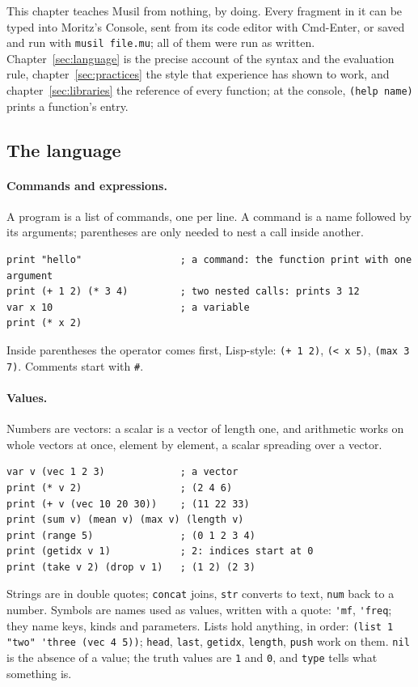 \documentclass[11pt,a4paper]{article}
\newcommand{\musil}[1]{\lstinline[style=musilinline]{#1}}
\begin{document}
This chapter teaches Musil from nothing, by doing. Every fragment in it can be typed into
Moritz's Console, sent from its code editor with Cmd-Enter, or saved and run with
\texttt{musil file.mu}; all of them were run as written. Chapter~\ref{sec:language} is the
precise account of the syntax and the evaluation rule, chapter~\ref{sec:practices} the
style that experience has shown to work, and chapter~\ref{sec:libraries} the reference of
every function; at the console, \musil{(help name)} prints a function's entry.

\subsection{The language}

\paragraph{Commands and expressions.} A program is a list of commands, one per line. A
command is a name followed by its arguments; parentheses are only needed to nest a call
inside another.

\begin{lstlisting}
print "hello"                 ; a command: the function print with one argument
print (+ 1 2) (* 3 4)         ; two nested calls: prints 3 12
var x 10                      ; a variable
print (* x 2)
\end{lstlisting}

Inside parentheses the operator comes first, Lisp-style: \musil{(+ 1 2)}, \musil{(< x 5)},
\musil{(max 3 7)}. Comments start with \texttt{\#}.

\paragraph{Values.} Numbers are vectors: a scalar is a vector of length one, and arithmetic
works on whole vectors at once, element by element, a scalar spreading over a vector.

\begin{lstlisting}
var v (vec 1 2 3)             ; a vector
print (* v 2)                 ; (2 4 6)
print (+ v (vec 10 20 30))    ; (11 22 33)
print (sum v) (mean v) (max v) (length v)
print (range 5)               ; (0 1 2 3 4)
print (getidx v 1)            ; 2: indices start at 0
print (take v 2) (drop v 1)   ; (1 2) (2 3)
\end{lstlisting}

Strings are in double quotes; \musil{concat} joins, \musil{str} converts to text,
\musil{num} back to a number. Symbols are names used as values, written with a quote:
\musil{'mf}, \musil{'freq}; they name keys, kinds and parameters. Lists hold anything, in
order: \musil{(list 1 "two" 'three (vec 4 5))}; \musil{head}, \musil{last}, \musil{getidx},
\musil{length}, \musil{push} work on them. \musil{nil} is the absence of a value; the
truth values are \musil{1} and \musil{0}, and \musil{type} tells what something is.
\end{document}
